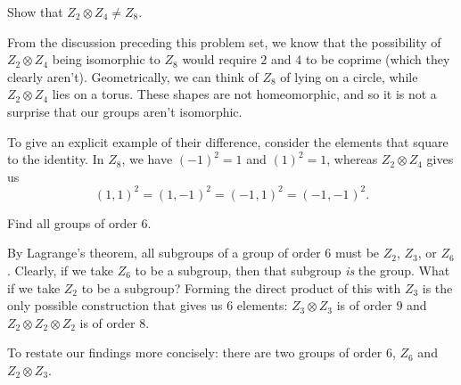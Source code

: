 \documentclass[../group-theory-in-a-nutshell-for-physicists.tex]{subfiles}
\begin{document}
\begin{questions}
\question Show that \(Z_{2} \otimes Z_{4} \neq Z_{8}\).

\begin{solution}
From the discussion preceding this problem set, we know that the
possibility of $Z_{2} \otimes Z_{4}$ being isomorphic to $Z_{8}$
would require $2$ and $4$ to be coprime (which they clearly aren't).
Geometrically, we can think of \(Z_{8}\) of lying on a circle, while
\(Z_{2} \otimes Z_{4}\) lies on a torus. These shapes are not
homeomorphic, and so it is not a surprise that our groups aren't
isomorphic.

To give an explicit example of their difference, consider the elements
that square to the identity. In $Z_{8}$, we have $( - 1)^{2} = 1$
and $(1)^{2} = 1$, whereas $Z_{2} \otimes Z_{4}$ gives us
\[
(1,1)^{2} = (1,{- 1}^{})^{2} = ({- 1}^{},1)^{2} = ({- 1}^{},{- 1}^{})^{2}.
\]
\end{solution}

\question Find all groups of order $6$.

\begin{solution}
By Lagrange's theorem, all subgroups of a group of order \(6\) must be
$Z_{2}$, $Z_{3}$, or $Z_{6}$. Clearly, if we take $Z_{6}$ to be
a subgroup, then that subgroup \emph{is} the group. What if we take
$Z_{2}$ to be a subgroup? Forming the direct product of this with
$Z_{3}$ is the only possible construction that gives us $6$
elements: $Z_{3} \otimes Z_{3}$ is of order $9$ and
$Z_{2} \otimes Z_{2} \otimes Z_{2}$ is of order $8$.

To restate our findings more concisely: there are two groups of order
$6$, $Z_{6}$ and $Z_{2} \otimes Z_{3}$.
\end{solution}

\end{questions}
\end{document}
